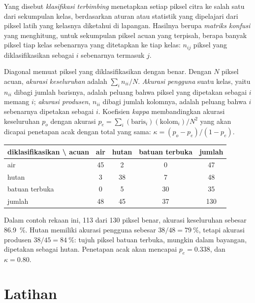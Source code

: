 \begin{definition}\label{def:b3:remote-sensing-gis:classification}
Yang disebut \emph{klasifikasi terbimbing} menetapkan setiap piksel citra
ke salah satu dari sekumpulan kelas, berdasarkan aturan atau statistik
yang dipelajari dari piksel latih yang kelasnya diketahui di lapangan.
Hasilnya berupa \emph{matriks konfusi} yang menghitung, untuk
sekumpulan piksel acuan yang terpisah, berapa banyak piksel tiap kelas sebenarnya yang ditetapkan ke tiap kelas:
$n_{ij}$ piksel yang diklasifikasikan sebagai $i$ sebenarnya termasuk $j$.
\end{definition}

Diagonal memuat piksel yang diklasifikasikan dengan benar. Dengan $N$ piksel acuan,
\emph{akurasi keseluruhan} adalah $\sum_i n_{ii}/N$. \emph{Akurasi
pengguna} suatu kelas, yaitu $n_{ii}$ dibagi jumlah barisnya, adalah peluang bahwa
piksel yang dipetakan sebagai $i$ memang $i$; \emph{akurasi produsen}, $n_{ii}$ dibagi
jumlah kolomnya, adalah peluang bahwa $i$ sebenarnya dipetakan sebagai $i$. Koefisien
\emph{kappa} membandingkan akurasi keseluruhan $p_o$ dengan
akurasi $p_e = \sum_i (\text{baris}_i)(\text{kolom}_i)/N^2$ yang akan dicapai
penetapan acak dengan total yang sama: $\kappa = (p_o - p_e)/(1 -
p_e)$.

\begin{center}
\small
\begin{tabular}{l|ccc|c}
\hline
diklasifikasikan \textbackslash{} acuan & air & hutan & batuan terbuka & jumlah \\
\hline
air & 45 & 2 & 0 & 47 \\
hutan & 3 & 38 & 7 & 48 \\
batuan terbuka & 0 & 5 & 30 & 35 \\
\hline
jumlah & 48 & 45 & 37 & 130 \\
\hline
\end{tabular}
\end{center}

Dalam contoh rekaan ini, 113 dari 130 piksel benar, akurasi keseluruhan
sebesar \qty{86.9}{\percent}. Hutan memiliki akurasi pengguna sebesar
$38/48 = \qty{79}{\percent}$, tetapi akurasi produsen $38/45 =
\qty{84}{\percent}$: tujuh piksel batuan terbuka, mungkin dalam bayangan, dipetakan sebagai hutan.
Penetapan acak akan mencapai $p_e = 0.338$, dan $\kappa =
0.80$.

\section{Latihan}

